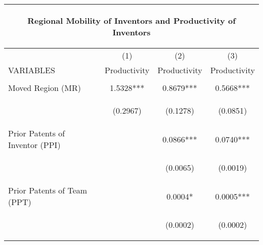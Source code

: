 \begin{center}
\begin{tabular}{lccc}
\multicolumn{4}{c}{\begin{large}Regional Mobility of Inventors and Productivity of Inventors\end{large}} \\ \hline
 & (1) & (2) & (3) \\
VARIABLES & Productivity & Productivity & Productivity \\ \hline
\vspace{4pt} & \begin{footnotesize}\end{footnotesize} & \begin{footnotesize}\end{footnotesize} & \begin{footnotesize}\end{footnotesize} \\
Moved Region (MR) & 1.5328*** & 0.8679*** & 0.5668*** \\
\vspace{4pt} & \begin{footnotesize}(0.2967)\end{footnotesize} & \begin{footnotesize}(0.1278)\end{footnotesize} & \begin{footnotesize}(0.0851)\end{footnotesize} \\
Prior Patents of Inventor (PPI) &  & 0.0866*** & 0.0740*** \\
\vspace{4pt} & \begin{footnotesize}\end{footnotesize} & \begin{footnotesize}(0.0065)\end{footnotesize} & \begin{footnotesize}(0.0019)\end{footnotesize} \\
Prior Patents of Team (PPT) &  & 0.0004* & 0.0005*** \\
\vspace{4pt} & \begin{footnotesize}\end{footnotesize} & \begin{footnotesize}(0.0002)\end{footnotesize} & \begin{footnotesize}(0.0002)\end{footnotesize} \\

\end{tabular}
\end{center}
